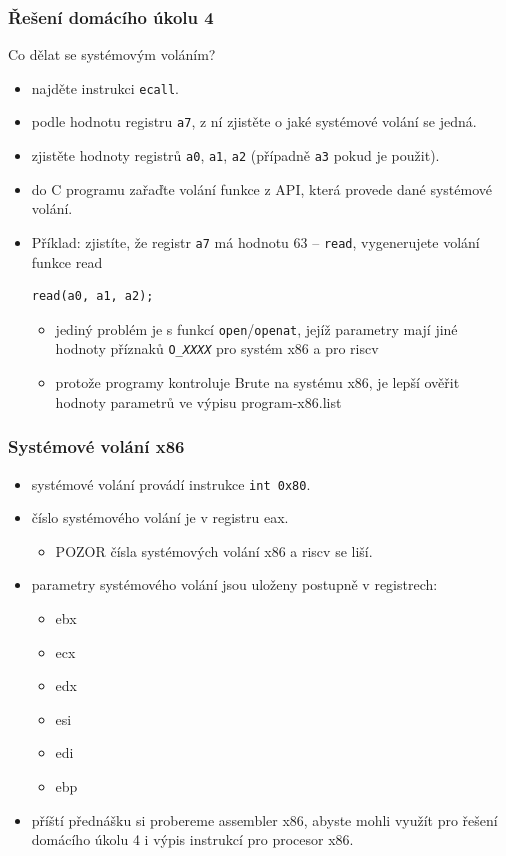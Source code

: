 \documentclass{beamer}
\begin{document}
\begin{frame}[fragile]
\frametitle{Řešení domácího úkolu 4}

Co dělat se systémovým voláním?
\begin{itemize}
\item najděte instrukci \texttt{ecall}.
\item podle hodnotu registru \texttt{a7}, z ní zjistěte o jaké systémové volání se jedná.
\item zjistěte hodnoty registrů \texttt{a0}, \texttt{a1}, \texttt{a2} (případně \texttt{a3} pokud je použit).
\item do C programu zařaďte volání funkce z API, která provede dané systémové volání.
\item Příklad: zjistíte, že registr \texttt{a7} má hodnotu 63 -- \texttt{read}, vygenerujete volání funkce read
\begin{verbatim}
read(a0, a1, a2);
\end{verbatim}
\begin{itemize}
 \item jediný problém je s funkcí \texttt{open}/\texttt{openat}, jejíž parametry mají jiné hodnoty příznaků \texttt{O\_\textit{XXXX}} pro systém x86 a pro riscv
 \item protože programy kontroluje Brute na systému x86, je lepší ověřit hodnoty parametrů ve výpisu program-x86.list
 \end{itemize}
\end{itemize}
\end{frame}


\begin{frame}
\frametitle{Systémové volání x86}

\begin{itemize}
\item systémové volání provádí instrukce \texttt{int 0x80}.
\item číslo systémového volání je v registru eax.
 \begin{itemize}
 \item POZOR čísla systémových volání x86 a riscv se liší.
 \end{itemize}
\item parametry systémového volání jsou uloženy postupně v registrech:
 \begin{itemize}
 \item ebx 
 \item ecx 
 \item edx 
 \item esi 
 \item edi 
 \item ebp 
 \end{itemize}
\item příští přednášku si probereme assembler x86, abyste mohli využít pro řešení domácího úkolu 4 i výpis instrukcí pro procesor x86.
\end{itemize}
\end{frame}
\end{document}
